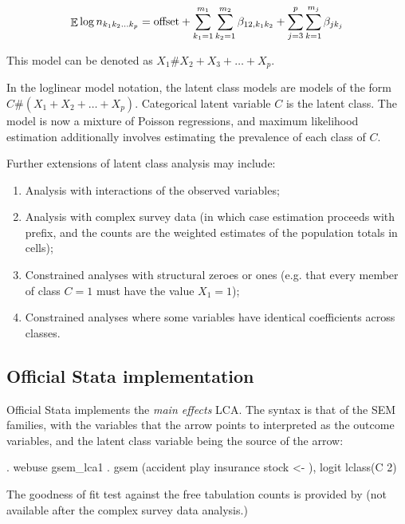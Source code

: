 \begin{equation}
  \label{eq:loglinear:x1x2}
  \mathop{\mathbb{E}} \log n_{{k_1}{k_2}\ldots{k_p}} = 
  \mathrm{offset} + 
  \sum_{k_1=1}^{m_1} \sum_{k_2=1}^{m_2} \beta_{12,k_1k_2} +
  \sum_{j=3}^p \sum_{k=1}^{m_j} \beta_{jk_j} 
\end{equation}

This model can be denoted as $X_1 \# X_2 + X_3 + \ldots + X_p$.

In the loglinear model notation, the latent class models 
are models of the form $C \# (X_1 + X_2 + \ldots + X_p)$.
Categorical latent variable $C$ is the latent class.
The model is now a mixture of Poisson regressions,
and maximum likelihood estimation additionally involves 
estimating the prevalence of each class of $C$.

Further extensions of latent class analysis may include:

\begin{enumerate}
  \item Analysis with interactions of the observed variables;
  \item Analysis with complex survey data (in which case estimation proceeds
      with  prefix, and the counts are the weighted estimates 
      of the population totals in cells);
  \item Constrained analyses with structural zeroes or ones 
      (e.g. that every member of class $C=1$ must have the value
      $X_1=1$);
  \item Constrained analyses where some variables have identical
      coefficients across classes.
\end{enumerate}

\subsection{Official Stata implementation}

Official Stata  implements 
the \textit{main effects} LCA. The syntax is that of the SEM
families, with the variables that the arrow points to
interpreted as the outcome variables, and the latent class
variable being the source of the arrow:

\begin{stlog}
. webuse gsem_lca1
\smallskip
. gsem (accident play insurance stock <- ), logit lclass(C 2)
\end{stlog}

The goodness of fit test against the free tabulation counts
is provided by  (not available after
the complex survey data analysis.)

